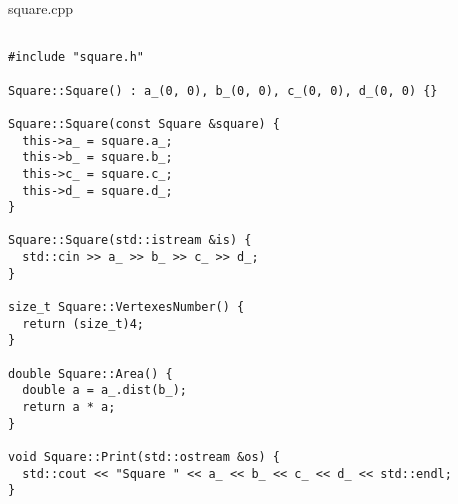 \documentclass[12pt]{article}
\begin{document}
\begin{flushleft}
{\Huge square.cpp}
\begin{verbatim}

#include "square.h"

Square::Square() : a_(0, 0), b_(0, 0), c_(0, 0), d_(0, 0) {}

Square::Square(const Square &square) {
  this->a_ = square.a_;
  this->b_ = square.b_;
  this->c_ = square.c_;
  this->d_ = square.d_;
}

Square::Square(std::istream &is) {
  std::cin >> a_ >> b_ >> c_ >> d_;
}

size_t Square::VertexesNumber() {
  return (size_t)4;
}

double Square::Area() {
  double a = a_.dist(b_);
  return a * a;
}

void Square::Print(std::ostream &os) {
  std::cout << "Square " << a_ << b_ << c_ << d_ << std::endl;
}
\end{verbatim}
\end{flushleft}
\end{document}
